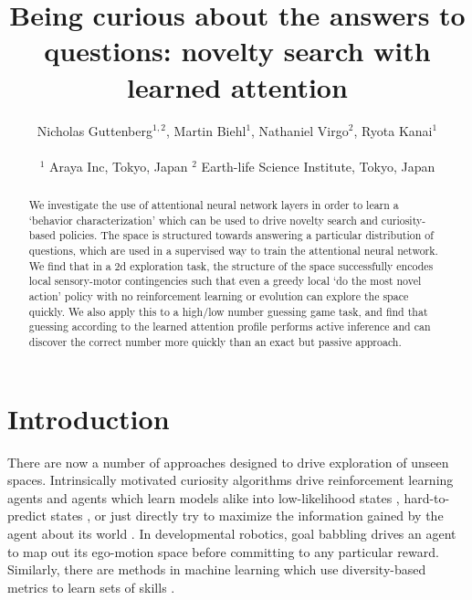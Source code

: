 \documentclass[letterpaper]{article}
\title{Being curious about the answers to questions: novelty search with learned attention}
\author{Nicholas Guttenberg$^{1,2}$, Martin Biehl$^{1}$, Nathaniel Virgo$^{2}$, Ryota Kanai$^{1}$ \\
\mbox{}\\
$^1$ Araya Inc, Tokyo, Japan
$^2$ Earth-life Science Institute, Tokyo, Japan}
\begin{document}
\maketitle

\setlength{\parskip}{0pt}

\begin{abstract}
We investigate the use of attentional neural network layers in order to learn a `behavior characterization' which can be used to drive novelty search and curiosity-based policies. The space is structured towards answering a particular distribution of questions, which are used in a supervised way to train the attentional neural network. We find that in a 2d exploration task, the structure of the space successfully encodes local sensory-motor contingencies such that even a greedy local `do the most novel action' policy with no reinforcement learning or evolution can explore the space quickly. We also apply this to a high/low number guessing game task, and find that guessing according to the learned attention profile performs active inference and can discover the correct number more quickly than an exact but passive approach.
\end{abstract}

\section{Introduction}

There are now a number of approaches designed to drive exploration of unseen spaces. Intrinsically motivated curiosity algorithms drive reinforcement learning agents and agents which learn models alike into low-likelihood states \citep{ostrovski2017count, achiam2017surprise}, hard-to-predict states \citep{pathak2017curiosity}, or just directly try to maximize the information gained by the agent about its world \citep{friston2015active, houthooft2016vime, de2018curiosity}. In developmental robotics, goal babbling \citep{baranes2013active} drives an agent to map out its ego-motion space before committing to any particular reward. Similarly, there are methods in machine learning which use diversity-based metrics to learn sets of skills \citep{guttenberg2017learning, eysenbach2018diversity}. 
\end{document}
